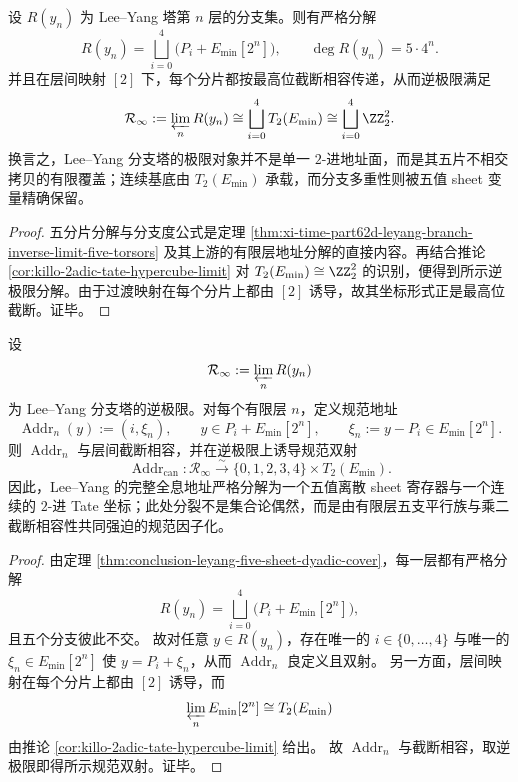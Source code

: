 \begin{theorem}\label{thm:conclusion-leyang-five-sheet-dyadic-cover}
设 \(R(y_n)\) 为 Lee--Yang 塔第 \(n\) 层的分支集。则有严格分解
\[
R(y_n)=\bigsqcup_{i=0}^{4}\bigl(P_i+E_{\min}[2^n]\bigr),
\qquad
\deg R(y_n)=5\cdot 4^n.
\]
并且在层间映射 \([2]\) 下，每个分片都按最高位截断相容传递，从而逆极限满足
\[
\mathcal R_\infty:=\varprojlim_n R(y_n)
\cong
\bigsqcup_{i=0}^{4}T_2(E_{\min})
\cong
\bigsqcup_{i=0}^{4}\ZZ_2^2.
\]
换言之，Lee--Yang 分支塔的极限对象并不是单一 \(2\)-进地址面，而是其五片不相交拷贝的有限覆盖；连续基底由 \(T_2(E_{\min})\) 承载，而分支多重性则被五值 sheet 变量精确保留。
\end{theorem}
\begin{proof}
五分片分解与分支度公式是定理 \ref{thm:xi-time-part62d-leyang-branch-inverse-limit-five-torsors} 及其上游的有限层地址分解的直接内容。再结合推论 \ref{cor:killo-2adic-tate-hypercube-limit} 对 \(T_2(E_{\min})\cong\ZZ_2^2\) 的识别，便得到所示逆极限分解。由于过渡映射在每个分片上都由 \([2]\) 诱导，故其坐标形式正是最高位截断。证毕。
\end{proof}

\begin{theorem}\label{thm:conclusion-leyang-canonical-address-discrete-continuous-splitting}
设
\[
\mathcal R_\infty:=\varprojlim_n R(y_n)
\]
为 Lee--Yang 分支塔的逆极限。对每个有限层 \(n\)，定义规范地址
\[
\operatorname{Addr}_n(y):=(i,\xi_n),
\qquad
y\in P_i+E_{\min}[2^n],
\qquad
\xi_n:=y-P_i\in E_{\min}[2^n].
\]
则 \(\operatorname{Addr}_n\) 与层间截断相容，并在逆极限上诱导规范双射
\[
\operatorname{Addr}_{\mathrm{can}}:\mathcal R_\infty\xrightarrow{\sim}\{0,1,2,3,4\}\times T_2(E_{\min}).
\]
因此，Lee--Yang 的完整全息地址严格分解为一个五值离散 sheet 寄存器与一个连续的 \(2\)-进 Tate 坐标；此处分裂不是集合论偶然，而是由有限层五支平行族与乘二截断相容性共同强迫的规范因子化。
\end{theorem}
\begin{proof}
由定理 \ref{thm:conclusion-leyang-five-sheet-dyadic-cover}，每一层都有严格分解
\[
R(y_n)=\bigsqcup_{i=0}^{4}\bigl(P_i+E_{\min}[2^n]\bigr),
\]
且五个分支彼此不交。
故对任意 \(y\in R(y_n)\)，存在唯一的 \(i\in\{0,\dots,4\}\) 与唯一的 \(\xi_n\in E_{\min}[2^n]\) 使 \(y=P_i+\xi_n\)，从而 \(\operatorname{Addr}_n\) 良定义且双射。
另一方面，层间映射在每个分片上都由 \([2]\) 诱导，而
\[
\varprojlim_n E_{\min}[2^n]\cong T_2(E_{\min})
\]
由推论 \ref{cor:killo-2adic-tate-hypercube-limit} 给出。
故 \(\operatorname{Addr}_n\) 与截断相容，取逆极限即得所示规范双射。证毕。
\end{proof}

